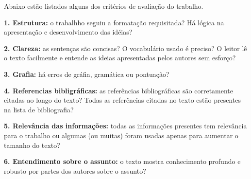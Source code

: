 \documentclass[a4paper,10pt]{article}
\begin{document}
    Abaixo estão listados alguns dos critérios de avaliação do trabalho.

    \textbf{1. Estrutura:} o trabalhho seguiu a formatação requisitada? Há lógica na apresentação e desenvolvimento das idéias?

    \textbf{2. Clareza:} as sentenças são concisas? O vocabulário usado é preciso? O leitor lê o texto facilmente e entende as ideias apresentadas pelos autores sem esforço?

    \textbf{3. Grafia:} há erros de gráfia, gramática ou pontuação?

    \textbf{4. Referencias bibligráficas:} as referências bibliográficas são corretamente citadas ao longo do texto? Todas as referências citadas no texto estão presentes na lista de bibliografia?

    \textbf{5. Relevância das informações:} todas as informações presentes tem relevância para o trabalho ou algumas (ou muitas) foram usadas apenas para aumentar o tamanho do texto?

   \textbf{6. Entendimento sobre o assunto:} o texto mostra conhecimento profundo e robusto por partes dos autores sobre o assunto?

  \clearpage %
\end{document}
